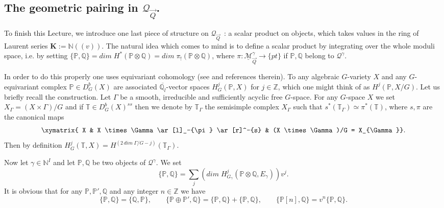 \documentclass[a4paper,10pt]{amsart}
\def\Z{\mathbb{Z}}
\def\N{\mathbb{N}}
\def\qlb{\overline{\mathbb{Q}_l}}
\def\QQ{\mathcal{Q}_{\vec{Q}}}
\numberwithin{equation}{section}
\begin{document}
\vspace{.3in}

\subsection{The geometric pairing in $\QQ$.}

\vspace{.15in}

To finish this Lecture, we introduce one last piece of structure on $\QQ$~: a scalar product on objects, which takes values in the ring of Laurent series $\mathbf{K}:=\N((v))$. The natural idea which comes to mind is to define a scalar product by integrating over the whole moduli space, i.e. by setting $\{ \mathbb{P}, \mathbb{Q}\}=dim \;H^*(\mathbb{P} \otimes \mathbb{Q})=dim\; \pi_!(\mathbb{P} \otimes \mathbb{Q})$, where $\pi: \underline{\mathcal{M}}^{\gamma}_{\vec{Q}} \to \{pt\}$ if $\mathbb{P}, \mathbb{Q}$ belong to $\mathcal{Q}^{\gamma}$. 

In order to do this properly one uses equivariant cohomology (see \cite{Lcusp} and references therein). To any algebraic $G$-variety $X$ and any $G$-equivariant complex $\mathbb{P} \in D^b_G(X)$ are associated $\qlb$-vector spaces $H^j_G(\mathbb{P},X)$ for $j \in \Z$, which one might think of as $H^j(\mathbb{P}, X/G)$. Let us briefly recall the construction. Let $\Gamma$ be a smooth, irreducible and sufficiently acyclic free $G$-space. For any $G$-space $X$ we set $X_\Gamma=(X \times \Gamma)/G$ and if $\mathbb{T} \in D^b_G(X)^{ss}$ then we denote by $\mathbb{T}_{\Gamma}$ the semisimple complex $X_{\Gamma}$ such that $s^*(\mathbb{T}_{\Gamma}) \simeq \pi^*(\mathbb{T})$, where $s, \pi$ are the canonical maps
$$\xymatrix{ X & X \times \Gamma \ar[l]_-{\pi} \ar[r]^-{s} & (X  \times \Gamma)/G = X_{\Gamma}}.$$
Then by definition $H^j_G(\mathbb{T},X)=H^{ (2\,dim\; \Gamma/G-j)}(\mathbb{T}_{\Gamma})$. 

\vspace{.1in}

Now let $\gamma \in \N^I$ and let $\mathbb{P}, \mathbb{Q}$ be two objects of $\mathcal{Q}^{\gamma}$. We set
\begin{equation}\label{E:defscalar}
\{\mathbb{P}, \mathbb{Q}\}=\sum_j (dim\;H^j_{G_{\gamma}}(\mathbb{P} \otimes \mathbb{Q}, E_{\gamma}))v^{j}.
\end{equation}
It is obvious that for any $\mathbb{P}, \mathbb{P}', \mathbb{Q}$ and any integer $n \in \Z$ we have
\begin{equation}\label{E:Obvious}
\{\mathbb{P}, \mathbb{Q}\}=\{\mathbb{Q},\mathbb{P}\}, \qquad
\{\mathbb{P} \oplus \mathbb{P}', \mathbb{Q}\}=\{\mathbb{P}, \mathbb{Q}\} + \{\mathbb{P}, \mathbb{Q}\}, \qquad
\{\mathbb{P}[n], \mathbb{Q}\}=v^n \{\mathbb{P}, \mathbb{Q}\}.
\end{equation}
\end{document}
